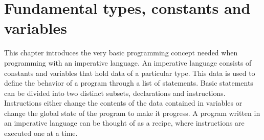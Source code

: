 \chapter{Fundamental types, constants and variables}
\nopagecolor{}
\label{chap:prog_basics}

This chapter introduces the very basic programming concept needed when
programming with an imperative language. An imperative language consists of
constants and variables that hold data of a particular type. This data is used
to define the behavior of a program through a list of statements. Basic
statements can be divided into two distinct subsets, declarations and
instructions. Instructions either change the contents of the data contained in
variables or change the global state of the program to make it progress. A
program written in an imperative language can be thought of as a recipe, where
instructions are executed one at a time.

\minitoc%

